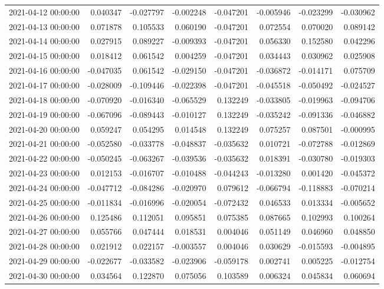 \begin{tabular}{lrrrrrrr}
2021-04-12 00:00:00 & 0.040347 & -0.027797 & -0.002248 & -0.047201 & -0.005946 & -0.023299 & -0.030962 \\
2021-04-13 00:00:00 & 0.071878 & 0.105533 & 0.060190 & -0.047201 & 0.072554 & 0.070020 & 0.089142 \\
2021-04-14 00:00:00 & 0.027915 & 0.089227 & -0.009393 & -0.047201 & 0.056330 & 0.152580 & 0.042296 \\
2021-04-15 00:00:00 & 0.018412 & 0.061542 & 0.004259 & -0.047201 & 0.034443 & 0.030962 & 0.025908 \\
2021-04-16 00:00:00 & -0.047035 & 0.061542 & -0.029150 & -0.047201 & -0.036872 & -0.014171 & 0.075709 \\
2021-04-17 00:00:00 & -0.028009 & -0.109446 & -0.022398 & -0.047201 & -0.045518 & -0.050492 & -0.024527 \\
2021-04-18 00:00:00 & -0.070920 & -0.016340 & -0.065529 & 0.132249 & -0.033805 & -0.019963 & -0.094706 \\
2021-04-19 00:00:00 & -0.067096 & -0.089443 & -0.010127 & 0.132249 & -0.035242 & -0.091336 & -0.046882 \\
2021-04-20 00:00:00 & 0.059247 & 0.054295 & 0.014548 & 0.132249 & 0.075257 & 0.087501 & -0.000995 \\
2021-04-21 00:00:00 & -0.052580 & -0.033778 & -0.048837 & -0.035632 & 0.010721 & -0.072788 & -0.012869 \\
2021-04-22 00:00:00 & -0.050245 & -0.063267 & -0.039536 & -0.035632 & 0.018391 & -0.030780 & -0.019303 \\
2021-04-23 00:00:00 & 0.012153 & -0.016707 & -0.010488 & -0.044243 & -0.013280 & 0.001420 & -0.045372 \\
2021-04-24 00:00:00 & -0.047712 & -0.084286 & -0.020970 & 0.079612 & -0.066794 & -0.118883 & -0.070214 \\
2021-04-25 00:00:00 & -0.011834 & -0.016996 & -0.020054 & -0.072432 & 0.046533 & 0.013334 & -0.005652 \\
2021-04-26 00:00:00 & 0.125486 & 0.112051 & 0.095851 & 0.075385 & 0.087665 & 0.102993 & 0.100264 \\
2021-04-27 00:00:00 & 0.055766 & 0.047444 & 0.018531 & 0.004046 & 0.051149 & 0.046960 & 0.048850 \\
2021-04-28 00:00:00 & 0.021912 & 0.022157 & -0.003557 & 0.004046 & 0.030629 & -0.015593 & -0.004895 \\
2021-04-29 00:00:00 & -0.022677 & -0.033582 & -0.023906 & -0.059178 & 0.002741 & 0.005225 & -0.012754 \\
2021-04-30 00:00:00 & 0.034564 & 0.122870 & 0.075056 & 0.103589 & 0.006324 & 0.045834 & 0.060694 \\

\end{tabular}
